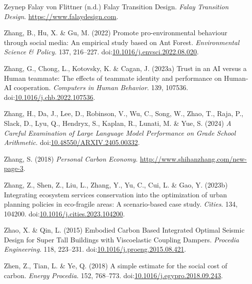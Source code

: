 \documentclass[
  letterpaper,
  DIV=11,
  numbers=noendperiod]{scrartcl}
\newlength{\cslhangindent}
\newenvironment{CSLReferences}[2] %
 {\begin{list}{}{%
  \setlength{\itemindent}{0pt}
  \setlength{\leftmargin}{0pt}
  \setlength{\parsep}{0pt}
  \ifodd #1
   \setlength{\leftmargin}{\cslhangindent}
   \setlength{\itemindent}{-1\cslhangindent}
  \fi
  \setlength{\itemsep}{#2\baselineskip}}}
 {\end{list}}
\begin{document}
\begin{CSLReferences}{0}{1}
Zeynep Falay von Flittner (n.d.) Falay {Transition Design}. \emph{Falay
Transition Design}. \url{https://www.falaydesign.com}.

Zhang, B., Hu, X. \& Gu, M. (2022) Promote pro-environmental behaviour
through social media: {An} empirical study based on {Ant Forest}.
\emph{Environmental Science \& Policy}. 137, 216--227.
doi:\href{https://doi.org/10.1016/j.envsci.2022.08.020}{10.1016/j.envsci.2022.08.020}.

Zhang, G., Chong, L., Kotovsky, K. \& Cagan, J. (2023a) Trust in an {AI}
versus a {Human} teammate: {The} effects of teammate identity and
performance on {Human-AI} cooperation. \emph{Computers in Human
Behavior}. 139, 107536.
doi:\href{https://doi.org/10.1016/j.chb.2022.107536}{10.1016/j.chb.2022.107536}.

Zhang, H., Da, J., Lee, D., Robinson, V., Wu, C., Song, W., Zhao, T.,
Raja, P., Slack, D., Lyu, Q., Hendryx, S., Kaplan, R., Lunati, M. \&
Yue, S. (2024) \emph{A {Careful Examination} of {Large Language Model
Performance} on {Grade School Arithmetic}}.
doi:\href{https://doi.org/10.48550/ARXIV.2405.00332}{10.48550/ARXIV.2405.00332}.

Zhang, S. (2018) \emph{Personal {Carbon Economy}}.
\url{http://www.shihanzhang.com/new-page-3}.

Zhang, Z., Shen, Z., Liu, L., Zhang, Y., Yu, C., Cui, L. \& Gao, Y.
(2023b) Integrating ecosystem services conservation into the
optimization of urban planning policies in eco-fragile areas: {A}
scenario-based case study. \emph{Cities}. 134, 104200.
doi:\href{https://doi.org/10.1016/j.cities.2023.104200}{10.1016/j.cities.2023.104200}.

Zhao, X. \& Qin, L. (2015) Embodied {Carbon Based Integrated Optimal
Seismic Design} for {Super Tall Buildings} with {Viscoelastic Coupling
Dampers}. \emph{Procedia Engineering}. 118, 223--231.
doi:\href{https://doi.org/10.1016/j.proeng.2015.08.421}{10.1016/j.proeng.2015.08.421}.

Zhen, Z., Tian, L. \& Ye, Q. (2018) A simple estimate for the social
cost of carbon. \emph{Energy Procedia}. 152, 768--773.
doi:\href{https://doi.org/10.1016/j.egypro.2018.09.243}{10.1016/j.egypro.2018.09.243}.


\end{CSLReferences}
\end{document}
